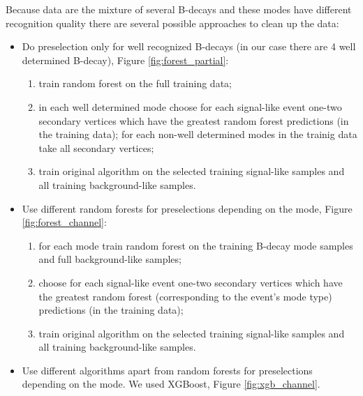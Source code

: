 \documentclass{llncs}
\begin{document}
Because data are the mixture of several B-decays and these modes have different recognition quality there are several possible approaches to clean up the data:
\begin{itemize}
	\item Do preselection only for well recognized B-decays (in our case there are 4 well determined B-decay), Figure \ref{fig:forest_partial}:
		\begin{enumerate}
			\item train random forest on the full training data;
			\item in each well determined mode choose for each signal-like event one-two secondary vertices which have the greatest random forest predictions (in the training data); for each non-well determined modes in the trainig data take all secondary vertices;
			\item train original algorithm on the selected training signal-like samples and all training background-like samples.
		\end{enumerate}

	\item Use different random forests for preselections depending on the mode, Figure \ref{fig:forest_channel}:
	\begin{enumerate}
			\item for each mode train random forest on the training B-decay mode samples and full background-like samples;
			\item choose for each signal-like event one-two secondary vertices which have the greatest random forest (corresponding to the event's mode type) predictions (in the training data);
			\item train original algorithm on the selected training signal-like samples and all training background-like samples.
		\end{enumerate}
	\item Use different algorithms apart from random forests for preselections depending on the mode. We used XGBoost, Figure \ref{fig:xgb_channel}.
\end{itemize}
\end{document}
